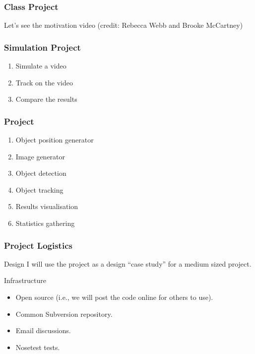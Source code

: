 \begin{frame}[fragile]
\frametitle{Class Project}

Let's see the motivation video (credit: Rebecca Webb and Brooke McCartney)
\end{frame}

\begin{frame}[fragile]
\frametitle{Simulation Project}

\begin{enumerate}
\item Simulate a video
\item Track on the video
\item Compare the results
\end{enumerate}
\end{frame}

\begin{frame}[fragile]
\frametitle{Project}
\begin{enumerate}
\item Object position generator
\item Image generator
\item Object detection
\item Object tracking
\item Results visualisation
\item Statistics gathering
\end{enumerate}
\end{frame}

\begin{frame}[fragile]
\frametitle{Project Logistics}

\begin{block}{Design}
I will use the project as a design ``case study'' for a medium sized project.
\end{block}

\begin{block}{Infrastructure}
\begin{itemize}
\item Open source (i.e., we will post the code online for others to use).
\item Common Subversion repository.
\item Email discussions.
\item Nosetest tests.
\end{itemize}
\end{block}

\end{frame}


